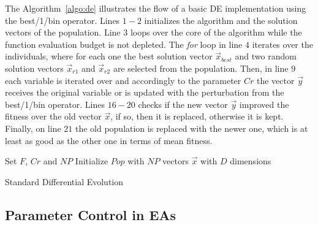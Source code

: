 The Algorithm~\ref{algo:de} illustrates the flow of a basic \ac{DE} implementation using the
best/1/bin operator. Lines $1-2$ initializes the algorithm and the solution vectors
of the population.
Line $3$ loops over the core of the algorithm while the function evaluation
budget is not depleted. The \textit{for} loop in line $4$ iterates over the individuals, where
for each one the best solution vector $\Vec{x}_{best}$ and two random solution vectors
$\Vec{x}_{r1}$ and $\Vec{x}_{r2}$ are selected from the population. Then, in line $9$
each variable is iterated over and accordingly to the parameter $Cr$ the vector $\Vec{y}$
receives the original variable or is updated with the perturbation from the
best/1/bin operator. Lines $16-20$ checks if the new vector $\Vec{y}$ improved the
fitness over the old vector $\Vec{x}$, if so, then it is replaced, otherwise it is kept.
Finally, on line $21$ the old population is replaced with the newer one, which is at
least as good as the other one in terms of mean fitness.

\vspace{2mm}

\begin{algorithm}[H]
\SetAlgoLined
Set $F$, $Cr$ and $NP$\;
Initialize $Pop$ with $NP$ vectors $\Vec{x}$ with $D$ dimensions\;
    \caption{Standard Differential Evolution}
    \label{algo:de}
\end{algorithm}


\subsection{Parameter Control in EAs}

